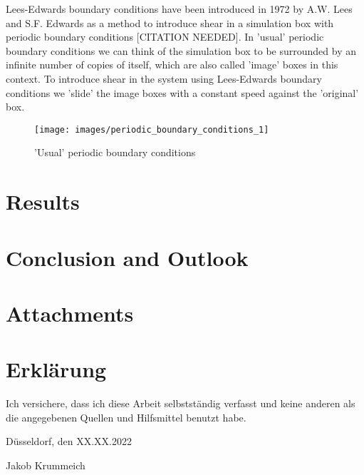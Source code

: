 \documentclass[DIV=9,11pt,BCOR=5mm,twoside=semi,abstract]{scrreprt}
\begin{document}
	Lees-Edwards boundary conditions have been introduced in 1972 by A.W. Lees and S.F. Edwards as a method to introduce shear in a simulation box with periodic boundary conditions [CITATION NEEDED]. In 'usual' periodic boundary conditions we can think of  the simulation box to be surrounded by an infinite number of copies of itself, which are also called 'image' boxes in this context. To introduce shear in the system using Lees-Edwards boundary conditions we 'slide' the image boxes with a constant speed against the 'original' box.
	
	\begin{figure}[H]
		\centering
		\texttt{[image: images/periodic\_boundary\_conditions\_1]}
		\caption{'Usual' periodic boundary conditions}
		\label{fig:periodic_boundary_conditions}
	\end{figure}

	\chapter{Results}
	\label{chap:results}


\chapter{Conclusion and Outlook}
\label{chap:conclusion}


	\nocite{*}
	\begin{otherlanguage}{british}	%
		\printbibliography[title =Sources and References]
	\end{otherlanguage}

	
\chapter*{Attachments}




\chapter*{Erklärung}

Ich versichere, dass ich diese Arbeit selbstständig verfasst und keine anderen als die
angegebenen Quellen und Hilfsmittel benutzt habe. \vspace{2cm}


Düsseldorf, den XX.XX.2022

\vspace{2 cm}


Jakob Krummeich


	
\end{document}
